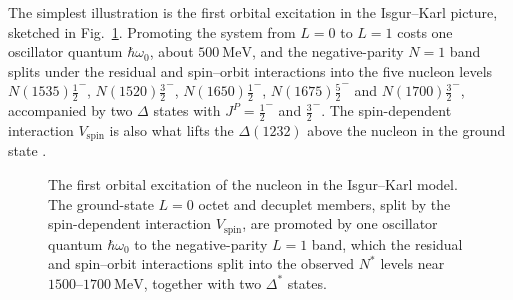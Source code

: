 The simplest illustration is the first orbital excitation in the Isgur--Karl picture,
sketched in Fig.~\ref{fig:isgur-karl}. Promoting the system from $L=0$ to $L=1$ costs one
oscillator quantum $\hbar\omega_0$, about $500~\mathrm{MeV}$, and the negative-parity
$N=1$ band splits under the residual and spin--orbit interactions into the five nucleon
levels $N(1535)\tfrac{1}{2}^-$, $N(1520)\tfrac{3}{2}^-$, $N(1650)\tfrac{1}{2}^-$,
$N(1675)\tfrac{5}{2}^-$ and $N(1700)\tfrac{3}{2}^-$, accompanied by two $\Delta$ states
with $J^{P}=\tfrac{1}{2}^-$ and $\tfrac{3}{2}^-$. The spin-dependent interaction
$V_{\text{spin}}$ is also what lifts the $\Delta(1232)$ above the nucleon in the ground
state \cite[Ch.~15]{Amsler2018}.

\begin{figure}[htbp]
    \centering
    \caption{The first orbital excitation of the nucleon in the Isgur--Karl model. The
    ground-state $L=0$ octet and decuplet members, split by the spin-dependent interaction
    $V_{\text{spin}}$, are promoted by one oscillator quantum $\hbar\omega_0$ to the
    negative-parity $L=1$ band, which the residual and spin--orbit interactions split into
    the observed $N^{*}$ levels near $1500$--$1700~\mathrm{MeV}$, together with two
    $\Delta^{*}$ states.}
    \label{fig:isgur-karl}
\end{figure}

